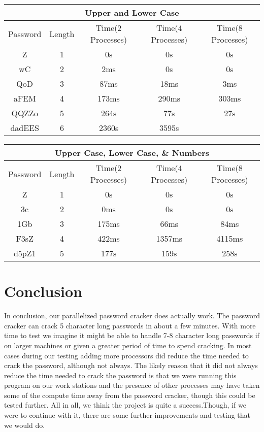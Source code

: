 \documentclass[11pt]{article}
\begin{document}
\begin{center}
 \begin{tabular}{||c c c c c||} 
 \hline
 
 \multicolumn{5}{|c|}{Upper and Lower Case} \\
 \hline
 \hline
 Password & Length & Time(2 Processes) & Time(4 Processes) & Time(8 Processes) \\ [0.5ex] 
 \hline\hline
 Z & 1 & 0s & 0s & 0s\\ 
 \hline
 wC & 2 & 2ms & 0s & 0s\\
 \hline
 QoD & 3 & 87ms & 18ms & 3ms\\
 \hline
 aFEM & 4 & 173ms & 290ms & 303ms\\
 \hline
 QQZZo & 5 & 264s & 77s & 27s\\ 
 \hline
 dadEES & 6 & 2360s & 3595s & \\
 [1ex] 
 \hline
\end{tabular}
\end{center}

\begin{center}
 \begin{tabular}{||c c c c c||} 
 \hline
 
 \multicolumn{5}{|c|}{Upper Case, Lower Case, \& Numbers} \\
 \hline
 \hline
 Password & Length & Time(2 Processes) & Time(4 Processes) & Time(8 Processes) \\ [0.5ex] 
 \hline\hline
 Z & 1 & 0s & 0s & 0s\\ 
 \hline
 3c & 2 & 0ms & 0s & 0s\\
 \hline
 1Gb & 3 & 175ms & 66ms & 84ms\\
 \hline
 F3sZ & 4 & 422ms & 1357ms & 4115ms\\
 \hline
 d5pZ1 & 5 & 177s & 159s & 258s\\ 
 [1ex] 
 \hline
\end{tabular}
\end{center}

\section{Conclusion}

In conclusion, our parallelized password cracker does actually work. The password cracker can crack 5 character long passwords in about a few minutes. With more time to test we imagine it might be able to handle 7-8 character long passwords if on larger machines or given a greater period of time to spend cracking. In most cases during our testing adding more processors did reduce the time needed to crack the password, although not always. The likely reason that it did not always reduce the time needed to crack the password is that we were running this program on our work stations and the presence of other processes may have taken some of the compute time away from the password cracker, though this could be tested further. All in all, we think the project is quite a success.Though, if we were to continue with it, there are some further improvements and testing that we would do.
\end{document}
